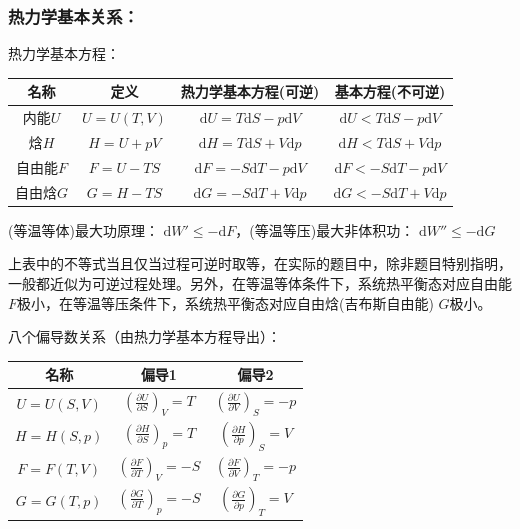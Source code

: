 \documentclass[zihao=5,UTF8]{report}
\begin{document}
\subsubsection{热力学基本关系：}
热力学基本方程：
\begin{table}[H]
    \centering
    \begin{tabular}{cccc} 
    \toprule
    名称 & 定义 & 热力学基本方程(可逆) & 基本方程(不可逆)  \\
    \midrule
    内能$U$ & $U = U(T,V)$ & $\mathrm{d}U = T\mathrm{d}S -p\mathrm{d}V $ &  $\mathrm{d}U < T\mathrm{d}S -p\mathrm{d}V $ \\
    焓$H$ & $H = U+pV$ & $\mathrm{d}H = T\mathrm{d}S  + V\mathrm{d}p$ &$\mathrm{d}H < T\mathrm{d}S  + V\mathrm{d}p$\\
    自由能$F$ & $F = U-TS$ & $\mathrm{d}F = -S\mathrm{d}T-p\mathrm{d}V$ & $\mathrm{d}F < -S\mathrm{d}T-p\mathrm{d}V$  \\
    自由焓$G$ & $G = H - TS$ & $\mathrm{d}G = -S\mathrm{d}T + V\mathrm{d}p$ & $\mathrm{d}G < -S\mathrm{d}T + V\mathrm{d}p$  \\
    \bottomrule
    \end{tabular}
\end{table}
(等温等体)最大功原理： $\mathrm{d}W' \le -\mathrm{d}F$，(等温等压)最大非体积功： $\mathrm{d}W'' \le -\mathrm{d}G$

{\par\color{gray}\small
上表中的不等式当且仅当过程可逆时取等，在实际的题目中，除非题目特别指明，一般都近似为可逆过程处理。另外，{\color{red}在等温等体条件下，系统热平衡态对应自由能$F$极小，在等温等压条件下，系统热平衡态对应自由焓(吉布斯自由能) $G$极小。}
\par}
八个偏导数关系（由热力学基本方程导出）：
\begin{table}[H]
    \centering
    \begin{tabular}{ccc} 
    \toprule
    名称 & 偏导1 & 偏导2  \\
    \midrule
    $U = U(S,V)$ & $\left(\frac{\partial U}{\partial S}\right)_V = T$ & $\left(\frac{\partial U}{\partial V}\right)_S =-p $ \\
    $H = H(S,p)$ & $\left(\frac{\partial H}{\partial S}\right)_p = T$ & $\left(\frac{\partial H}{\partial p}\right)_S = V $ \\
    $F = F(T,V)$ & $\left(\frac{\partial F}{\partial T}\right)_V = -S$ & $\left(\frac{\partial F}{\partial V}\right)_T = -p$ \\
    $G = G(T,p)$ & $\left(\frac{\partial G}{\partial T}\right)_p = -S$ & $\left(\frac{\partial G}{\partial p }\right)_T = V$ \\
    \bottomrule
    \end{tabular}
\end{table}
\end{document}
